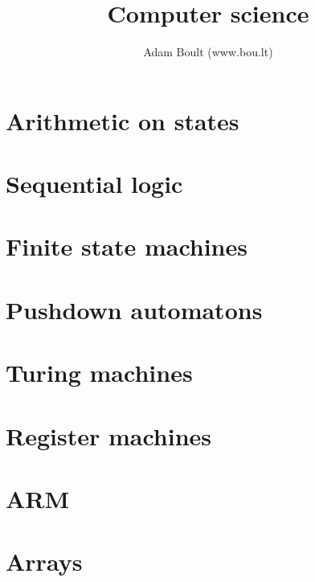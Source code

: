 \documentclass[oneside]{book}
\begin{document}
\author{Adam Boult (www.bou.lt)}
\title{Computer science}
\maketitle

\setcounter{tocdepth}{0}
\tableofcontents



\part{Arithmetic on states}






\part{Sequential logic}



\part{Finite state machines}



\part{Pushdown automatons}



\part{Turing machines}




\part{Register machines}





\part{ARM}









\part{Arrays}

\end{document}
